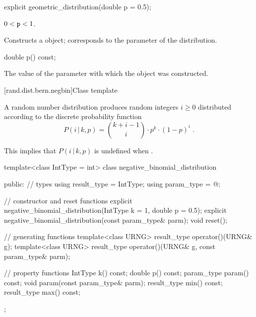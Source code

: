 %
\begin{itemdecl}
explicit geometric_distribution(double p = 0.5);
\end{itemdecl}

\begin{itemdescr}
\pnum\requires
 $0 < \texttt{p} < 1$.

\pnum\effects Constructs a  object;
 corresponds to the parameter of the distribution.
\end{itemdescr}

%
%
\begin{itemdecl}
double p() const;
\end{itemdecl}

\begin{itemdescr}
\pnum\returns The value of the  parameter
 with which the object was constructed.
\end{itemdescr}


[rand.dist.bern.negbin]{Class template }

\pnum
A  random number distribution
produces random integers $i \geq 0$
distributed according to
the discrete probability function
%
\[%
 P(i\,|\,k,p)
      = \binom{k+i-1}{i} \cdot p^k \cdot (1-p)^i
\; \mbox{.}
\]
\begin{note}
This implies that $P(i\,|\,k,p)$ is undefined when .
\end{note}

\begin{codeblock}
template<class IntType = int>
 class negative_binomial_distribution
{
public:
 // types
 using result_type = IntType;
 using param_type  = @\unspec@;

 // constructor and reset functions
 explicit negative_binomial_distribution(IntType k = 1, double p = 0.5);
 explicit negative_binomial_distribution(const param_type& parm);
 void reset();

 // generating functions
 template<class URNG>
   result_type operator()(URNG& g);
 template<class URNG>
   result_type operator()(URNG& g, const param_type& parm);

 // property functions
 IntType k() const;
 double p() const;
 param_type param() const;
 void param(const param_type& parm);
 result_type min() const;
 result_type max() const;
};
\end{codeblock}


